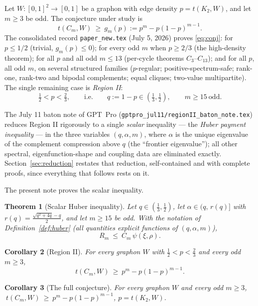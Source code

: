 \documentclass[11pt]{article}
\newtheorem{theorem}{Theorem}[section]
\newtheorem{corollary}[theorem]{Corollary}
\begin{document}
Let $W:[0,1]^2\to[0,1]$ be a graphon with edge density $p=t(K_2,W)$, and let
$m\ge3$ be odd.  The conjecture under study is
\begin{equation}\label{eq:conj}
        t(C_m,W)\ \ge\ g_m(p):=p^m-p(1-p)^{m-1}.
\end{equation}
The consolidated record \texttt{paper\_new.tex} (July 5, 2026) proves
\eqref{eq:conj}: for $p\le 1/2$ (trivial, $g_m(p)\le0$); for every odd $m$ when
$p\ge2/3$ (the high-density theorem); for all $p$ and all odd $m\le13$
(per-cycle theorems $C_3$--$C_{13}$); and for all $p$, all odd $m$, on several
structured families ($p$-regular; positive-spectrum-safe; rank-one, rank-two and
bipodal complements; equal cliques; two-value multipartite).  The single
remaining case is \emph{Region II}:
\[
        \tfrac12<p<\tfrac23,
        \qquad\text{i.e.}\qquad
        q:=1-p\in\left(\tfrac13,\tfrac12\right),
        \qquad m\ge15\ \text{odd}.
\]

The July 11 baton note of GPT~Pro (\texttt{gptpro\_jul11/regionII\_baton\_note.tex})
reduces Region II rigorously to a single \emph{scalar} inequality --- the
\emph{Huber payment inequality} --- in the three variables $(q,\alpha,m)$, where
$\alpha$ is the unique eigenvalue of the complement compression above $q$
(the ``frontier eigenvalue''); all other spectral, eigenfunction-shape and
coupling data are eliminated exactly.  Section~\ref{sec:reduction} restates that
reduction, self-contained and with complete proofs, since everything that
follows rests on it.

The present note proves the scalar inequality.

\begin{theorem}[Scalar Huber inequality]\label{thm:scalar}
Let $q\in(\tfrac13,\tfrac12)$, let $\alpha\in\bigl(q,\,r(q)\bigr]$ with
$r(q)=\frac{\sqrt{q^2+4q}-q}2$, and let $m\ge15$ be odd.  With the notation of
Definition~\ref{def:huber} (all quantities explicit functions of
$(q,\alpha,m)$),
\[
        R_m\ \le\ C_m\,\psi(\xi,\rho).
\]
\end{theorem}

\begin{corollary}[Region II]\label{cor:region2}
For every graphon $W$ with $\tfrac12<p<\tfrac23$ and every odd $m\ge3$,
\[
        t(C_m,W)\ \ge\ p^m-p(1-p)^{m-1}.
\]
\end{corollary}

\begin{corollary}[The full conjecture]\label{cor:full}
For every graphon $W$ and every odd $m\ge3$,
$\ t(C_m,W)\ \ge\ p^m-p(1-p)^{m-1}$, $p=t(K_2,W)$.
\end{corollary}
\end{document}

